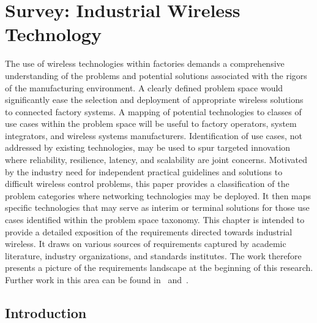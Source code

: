 

\newcommand{\argmax}{\operatornamewithlimits{arg\ max}}
\newtheorem{theorem}{Theorem}[section]
\newtheorem{lemma}[theorem]{Lemma}
\newtheorem{property}[theorem]{Property}

\chapter{Survey: Industrial Wireless Technology}\label{chapter:reswk}

	
\chapterintro*

The use of wireless technologies within factories demands a comprehensive understanding of the problems and potential solutions associated with the rigors of the manufacturing environment. A clearly defined problem space would significantly ease the selection and deployment of appropriate wireless solutions to connected factory systems.  A mapping of potential technologies to classes of use cases within the problem space will be useful to factory operators, system integrators, and wireless systems manufacturers.  Identification of use cases, not addressed by existing technologies, may be used to spur targeted innovation where reliability, resilience, latency, and scalability are joint concerns. Motivated by the industry need for independent practical guidelines and solutions to difficult wireless control problems, this paper provides a classification of the problem categories where networking technologies may be deployed. It then maps specific technologies that may serve as interim or terminal solutions for those use cases identified within the problem space taxonomy. This chapter is intended to provide a detailed exposition of the requirements directed towards industrial wireless.  It draws on various sources of requirements captured by academic literature, industry organizations, and standards institutes.  The work therefore presents a picture of the requirements landscape at the beginning of this research.  Further work in this area can be found in~\cite{Montgomery2019} and~\cite{Raptis2019}.

	\section{Introduction} \label{sec:intro}
